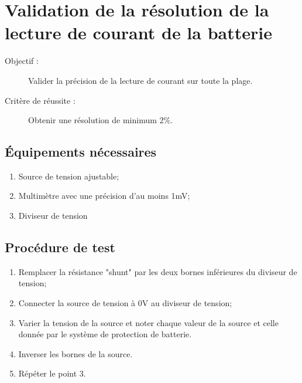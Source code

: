 
\section{Validation de la résolution de la lecture de courant de la batterie}

	\begin{description}
		\item[Objectif :] Valider la précision de la lecture de courant sur toute la plage.
		\item[Critère de réussite :] Obtenir une résolution de minimum 2\%.
	\end{description}
	
	\subsection*{Équipements nécessaires}
	\begin{enumerate}
		\item Source de tension ajustable;
		\item Multimètre avec une précision d'au moins 1mV;
		\item Diviseur de tension
	\end{enumerate}	
	
	\subsection*{Procédure de test}
	\begin{enumerate}
		\item Remplacer la résistance "shunt" par les deux bornes inférieures du diviseur de tension; 
		\item Connecter la source de tension à 0V au diviseur de tension;
		\item Varier la tension de la source et noter chaque valeur de la source et celle donnée par le système de protection de batterie.
		\item Inverser les bornes de la source.
		\item Répéter le point 3.
	\end{enumerate}